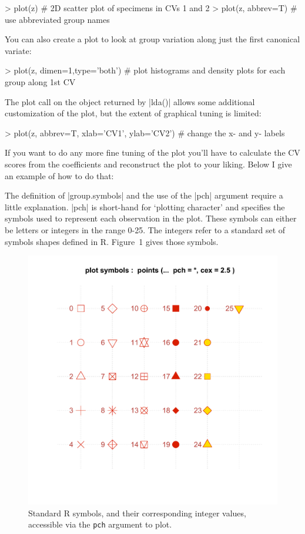 \begin{R}
> plot(z) # 2D scatter plot of specimens in CVs 1 and 2
> plot(z, abbrev=T) # use abbreviated group names
\end{R}

You can also create a plot to look at group variation along just the first canonical variate:

\begin{R}
> plot(z, dimen=1,type='both') # plot histograms and density plots for each group along 1st CV 
\end{R}


The plot call on the object returned by |lda()| allows some additional customization of the plot, but the extent of graphical tuning is limited:

\begin{R}
> plot(z, abbrev=T, xlab='CV1', ylab='CV2') # change the x- and y- labels
\end{R}

If you want to do any more fine tuning of the plot you'll have to calculate the CV scores from the coefficients and reconstruct the plot to your liking. Below I give an example of how to do that:


The definition of |group.symbols| and the use of the |pch| argument require a little explanation. |pch| is short-hand for `plotting  character' and specifies the symbols used to represent each observation in the plot.  These symbols can either be letters or integers in the range 0-25. The integers refer to a standard set of symbols shapes defined in R. Figure~1 gives those symbols.

\begin{figure}
\begin{center}

\includegraphics[width=0.5\columnwidth]{./figures/hands-on7/pch-symbols}

\end{center}
\caption{Standard R symbols, and their corresponding integer values, accessible via the \texttt{pch} argument to plot.}
\end{figure}

